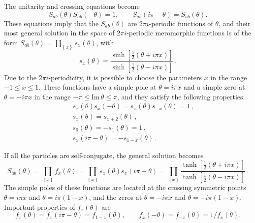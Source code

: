 \documentclass[a4paper,12pt]{report}
\begin{document}
The unitarity and crossing equations become
\begin{equation}\label{disting}
S_{ab}\left(\theta\right)S_{ab}\left(-\theta\right)=1,\qquad
S_{ab}\left(i\pi-\theta\right)=S_{\bar{a}b}\left(\theta\right).
\end{equation}
These equations imply that the $S_{ab}(\theta)$ are $2\pi i$-periodic functions of $\theta$, and their most
general solution in the space of $2\pi i$-periodic meromorphic functions is of the form
$S_{ab}(\theta)=\prod_{\left\{x\right\}}s_{x}(\theta)$, with
\begin{equation}
s_{x}(\theta)=\frac{\sinh\left[\frac{1}{2}(\theta+i\pi x)\right]}{\sinh\left[\frac{1}{2}(\theta-i\pi x)\right]}\,.
\end{equation}
Due to the $2\pi i$-periodicity, it is possible to choose the parameters $x$ in the range $-1\leq x\leq 1$. These
functions have a simple pole at $\theta=i\pi x$ and a simple zero at $\theta=-i\pi x$ in the range
$-\pi\leq\textrm{Im}\,\theta\leq\pi$, and they satisfy the following properties:
\begin{eqnarray}
&& s_{x}(\theta)s_{x}(-\theta)=s_{x}(\theta)s_{-x}(\theta)=1\,,\\
&& s_{x}(\theta)=s_{x+2}(\theta)\,,\\
&& s_{0}(\theta)=-s_{1}(\theta)=1\,,\\
&& s_{x}(i\pi-\theta)=-s_{1-x}(\theta)\,.
\end{eqnarray}

\vspace{0.5cm}

If all the particles are self-conjugate, the general solution becomes
\begin{equation}
S_{ab}(\theta)=\prod_{\left\{x\right\}}f_{x}(\theta)=\prod_{\left\{x\right\}}s_{x}(\theta)s_{x}(i\pi-\theta)=\prod_{\left\{x\right\}}\frac{\tanh\left[\frac{1}{2}(\theta+i\pi
x)\right]}{\tanh\left[\frac{1}{2}(\theta-i\pi x)\right]}\,.
\end{equation}
The simple poles of these functions are located at the crossing symmetric points $\theta=i\pi x$ and $\theta=i\pi
(1-x)$, and the zeros at $\theta=-i\pi x$ and $\theta=-i\pi(1-x)$. Important properties of $f_{x}(\theta)$ are
\begin{equation}
f_{x}(\theta)=f_{x}(i\pi-\theta)=f_{1-x}(\theta),\qquad f_{x}(-\theta)=f_{-x}(\theta)=1/f_{x}(\theta).
\end{equation}

\vspace{0.5cm}
\end{document}
